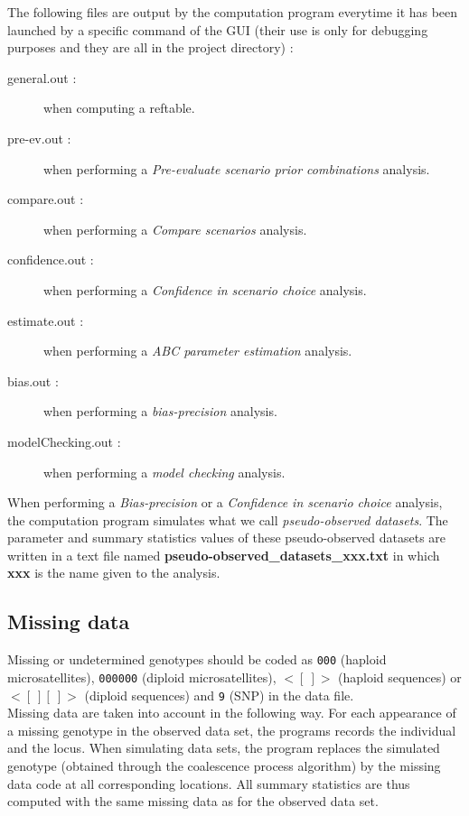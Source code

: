 The following files are output by the computation program everytime it has been launched by a specific command of the GUI (their use is only for debugging purposes and they are all in the project directory) :
\begin{description}
 \item [general.out :] when computing a reftable.
 \item [pre-ev.out :] when performing a \textit{Pre-evaluate scenario prior combinations} analysis.
 \item [compare.out :] when performing a \textit{Compare scenarios} analysis.
 \item [confidence.out :] when performing a \textit{Confidence in scenario choice} analysis.
 \item [estimate.out :] when performing a \textit{ABC parameter estimation} analysis.
 \item [bias.out :] when performing a \textit{bias-precision} analysis.
 \item [modelChecking.out :] when performing a \textit{model checking} analysis.
\end{description}

When performing a \textit{Bias-precision} or a \textit{Confidence in scenario choice} analysis, the computation program simulates what we call \textit{pseudo-observed datasets}. The parameter and summary statistics values of these pseudo-observed datasets are written in a text file named \textbf{pseudo-observed\_datasets\_xxx.txt} in which \textbf{xxx} is the name given to the analysis.


\subsection{Missing data}
Missing or undetermined genotypes should be coded as \texttt{000} (haploid microsatellites), \texttt{000000}  (diploid microsatellites), \texttt{$<[~]>$} (haploid sequences) or \texttt{$<[~][~]>$} (diploid sequences) and \texttt{9} (SNP) in the data file. \\
Missing data are taken into account in the following way. For each appearance of a missing genotype in the observed data set, the programs records the individual and the locus. When simulating data sets, the program replaces the simulated genotype (obtained through the coalescence process algorithm) by the missing data code at all corresponding locations. All summary statistics are thus computed with the same missing data as for the observed data set. 


